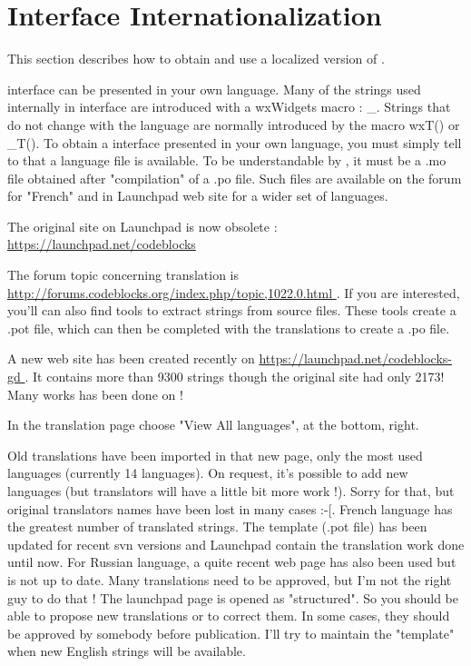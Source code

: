\section{\codeblocks Interface Internationalization}\label{sec:cb_Internationalization}

This section describes how to obtain and use a localized version of \codeblocks.

\codeblocks interface can be presented in your own language. Many of the strings used internally in \codeblocks interface are introduced with a wxWidgets macro : \_. Strings that do not change with the language are normally introduced by the macro wxT() or \_T(). To obtain a \codeblocks interface presented in your own language, you must simply tell to \codeblocks that a language file is available. To be understandable by \codeblocks, it must be a .mo file obtained after "compilation" of a .po file. Such files are available on the forum for "French" and in Launchpad web site for a wider set of languages.

\begin{description}
\item The original site on Launchpad is now obsolete : \url{https://launchpad.net/codeblocks }
\item The forum topic concerning translation is \url{http://forums.codeblocks.org/index.php/topic,1022.0.html }. If you are interested, you'll can also find tools to extract strings from \codeblocks source files. These tools create a .pot file, which can then be completed with the translations to create a .po file. 
\item A new web site has been created recently on \url{https://launchpad.net/codeblocks-gd }. It contains more than 9300 strings though the original site had only 2173! Many works has been done on \codeblocks !
\end{description}

In the translation page choose "View All languages", at the bottom, right.

Old translations have been imported in that new page, only the most used languages (currently 14 languages). On request, it's possible to add new languages (but translators will have a little bit more work !).\newline
Sorry for that, but original translators names have been lost in many cases  :-[.\newline
French language has the greatest number of translated strings. The template (.pot file) has been updated for recent svn versions and Launchpad contain the translation work done until now. For Russian language, a quite recent web page has also been used but is not up to date. Many translations need to be approved, but I'm not the right guy to do that !\newline
The launchpad page is opened as "structured". So you should be able to propose new translations or to correct them. In some cases, they should be approved by somebody before publication.\newline
I'll try to maintain the "template" when new English strings will be available.

